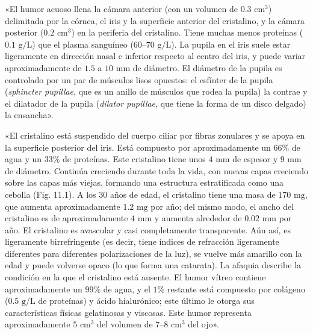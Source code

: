 \documentclass[12pt]{book}
\begin{document}
«El humor acuoso llena la cámara anterior (con un volumen de $0.3\text{ cm}^3$) delimitada por la córnea, el iris y la superficie anterior del cristalino, y la cámara posterior ($0.2\text{ cm}^3$) en la periferia del cristalino. Tiene muchas menos proteínas ($0.1\text{ g/L}$) que el plasma sanguíneo ($60\text{--}70\text{ g/L}$). La pupila en el iris suele estar ligeramente en dirección nasal e inferior respecto al centro del iris, y puede variar aproximadamente de $1.5$ a $10\text{ mm}$ de diámetro. El diámetro de la pupila es controlado por un par de músculos lisos opuestos: el esfínter de la pupila (\emph{sphincter pupillae}, que es un anillo de músculos que rodea la pupila) la contrae y el dilatador de la pupila (\emph{dilator pupillae}, que tiene la forma de un disco delgado) la ensancha».

«El cristalino está suspendido del cuerpo ciliar por fibras zonulares y se apoya en la superficie posterior del iris. Está compuesto por aproximadamente un $66\%$ de agua y un $33\%$ de proteínas. Este cristalino tiene unos $4\text{ mm}$ de espesor y $9\text{ mm}$ de diámetro. Continúa creciendo durante toda la vida, con nuevas capas creciendo sobre las capas más viejas, formando una estructura estratificada como una cebolla (Fig. 11.1). A los $30$ años de edad, el cristalino tiene una masa de $170\text{ mg}$, que aumenta aproximadamente $1.2\text{ mg}$ por año; del mismo modo, el ancho del cristalino es de aproximadamente $4\text{ mm}$ y aumenta alrededor de $0.02\text{ mm}$ por año. El cristalino es avascular y casi completamente transparente. Aún así, es ligeramente birrefringente (es decir, tiene índices de refracción ligeramente diferentes para diferentes polarizaciones de la luz), se vuelve más amarillo con la edad y puede volverse opaco (lo que forma una catarata). La afaquia describe la condición en la que el cristalino está ausente. El humor vítreo contiene aproximadamente un $99\%$ de agua, y el $1\%$ restante está compuesto por colágeno ($0.5\text{ g/L}$ de proteínas) y ácido hialurónico; este último le otorga sus características físicas gelatinosas y viscosas. Este humor representa aproximadamente $5\text{ cm}^3$ del volumen de $7\text{--}8\text{ cm}^3$ del ojo».
\end{document}
